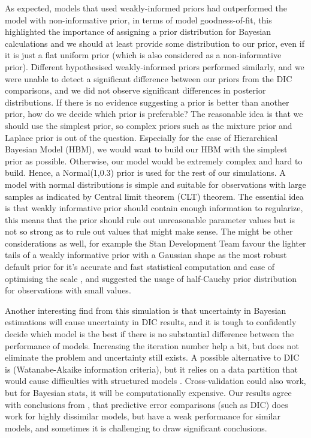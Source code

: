 As expected, models that used weakly-informed priors had outperformed the model with non-informative prior, in terms of model goodness-of-fit, this highlighted the importance of assigning a prior distribution for Bayesian calculations and we should at least provide some distribution to our prior, even if it is just a flat uniform prior (which is also considered as a non-informative prior). Different hypothesised weakly-informed priors performed similarly, and we were unable to detect a significant difference between our priors from the DIC comparisons, and we did not observe significant differences in posterior distributions. If there is no evidence suggesting a prior is better than another prior, how do we decide which prior is preferable? The reasonable idea is that we should use the simplest prior, so complex priors such as the mixture prior and Laplace prior is out of the question. Especially for the case of Hierarchical Bayesian Model (HBM), we would want to build our HBM with the simplest prior as possible. Otherwise, our model would be extremely complex and hard to build. Hence, a Normal(1,0.3) prior is used for the rest of our simulations. A model with normal distributions is simple and suitable for observations with large samples as indicated by Central limit theorem (CLT) theorem. The essential idea is that weakly informative prior should contain enough information to regularize, this means that the prior should rule out unreasonable parameter values but is not so strong as to rule out values that might make sense. The might be other considerations as well, for example the Stan Development Team favour the lighter tails of a weakly informative prior with a Gaussian shape as the most robust default prior for it's accurate and fast statistical computation and ease of optimising the scale \citep{stan2018}, and \citet{gelman2006prior} suggested the usage of half-Cauchy prior distribution for observations with small values. 

\newpara

Another interesting find from this simulation is that uncertainty in Bayesian estimations will cause uncertainty in DIC results, and it is tough to confidently decide which model is the best if there is no substantial difference between the performance of models. Increasing the iteration number help a bit, but does not eliminate the problem and uncertainty still exists. A possible alternative to DIC is (Watanabe-Akaike information criteria), but it relies on a data partition that would cause difficulties with structured models \citep{gelman2014understanding}. Cross-validation could also work, but for Bayesian stats, it will be computationally expensive. Our results agree with conclusions from \citet{gelman2014understanding}, that predictive error comparisons (such as DIC) does work for highly dissimilar models, but have a weak performance for similar models, and sometimes it is challenging to draw significant conclusions.

